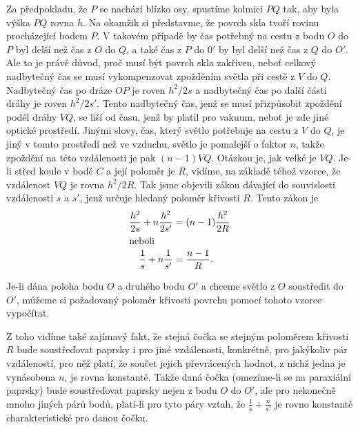 {    Za předpokladu, že \(P\) se nachází blízko osy, spustíme kolmici \(PQ\) tak, aby byla výška 
    \(PQ\) rovna \(h\). Na okamžik si představme, že povrch skla tvoří rovinu procházející bodem 
    \(P\). V takovém případě by čas potřebný na cestu z bodu \(O\) do \(P\) byl delší než čas z 
    \(O\) do \(Q\), a také čas z \(P\) do \(0'\) by byl delší než čas z \(Q\) do \(O'\). Ale to je 
    právě důvod, proč musí být povrch skla zakřiven, neboť celkový nadbytečný čas se musí 
    vykompenzovat zpožděním světla při cestě z \(V\) do \(Q\). Nadbytečný čas po dráze \(OP\) je 
    roven \(h^2/2s\) a nadbytečný čas po další části dráhy je roven \(h^2/2s'\). Tento nadbytečný 
    čas, jenž se musí přizpůsobit zpoždění podél dráhy \(VQ\), se liší od času, jenž by platil pro 
    vakuum, neboť je zde jiné optické prostředí. Jinými slovy, čas, který světlo potřebuje na cestu 
    z \(V\) do \(Q\), je jiný v tomto prostředí než ve vzduchu, světlo je pomalejší o faktor \(n\), 
    takže zpoždění na této vzdálenosti je pak \((n-1)VQ\). Otázkou je, jak velké je \(VQ\). Je-li 
    střed koule v bodě \(C\) a její poloměr je \(R\), vidíme, na základě téhož vzorce, že 
    vzdálenost \(VQ\) je rovna \(h^2/2R\). Tak jsme objevili zákon dávající do souvislosti 
    vzdálenosti \(s\) a \(s'\), jenž určuje hledaný poloměr křivosti \(R\). Tento zákon je
    \begin{subequations}\label{fyz:eq360}
      \begin{align}
        \frac{h^2}{2s} + n\frac{h^2}{2s'} &= (n-1)\frac{h^2}{2R} \label{fyz:eq360a} \\
        \shortintertext{neboli}
        \frac{1}{s} + n\frac{1}{s'}       &= \frac{n-1}{R}.      \label{fyz:eq360b}
      \end{align}    
    \end{subequations}

    Je-li dána poloha bodu \(O\) a druhého bodu \(O'\) a chceme světlo z \(O\) soustředit do 
    \(O'\), můžeme si požadovaný poloměr křivosti povrchu pomocí tohoto vzorce vypočítat.
    
    Z toho vidíme také zajímavý fakt, že stejná čočka se stejným poloměrem křivosti \(R\) bude 
    soustřeďovat paprsky i pro jiné vzdálenosti, konkrétně, pro jakýkoliv pár vzdáleností, pro něž 
    platí, že součet jejich převrácených hodnot, z nichž jedna je vynásobena \(n\), je rovna 
    konstantě. Takže daná čočka (omezíme-li se na paraxiální paprsky) bude soustřeďovat paprsky 
    nejen z bodu \(O\) do \(O'\), ale pro nekonečně mnoho jiných párů bodů, platí-li pro tyto páry 
    vztah, že \(\frac{1}{s} + \frac{n}{s'}\) je rovno konstantě charakteristické pro danou čočku.
    
}
